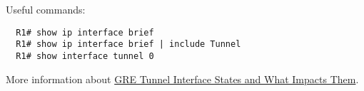 Useful commands:
\begin{verbatim}
  R1# show ip interface brief
  R1# show ip interface brief | include Tunnel
  R1# show interface tunnel 0
\end{verbatim}

More information about \href{https://www.cisco.com/c/en/us/support/docs/ip/generic-routing-encapsulation-gre/118361-technote-gre-00.html}{GRE Tunnel Interface States and What Impacts Them}.
